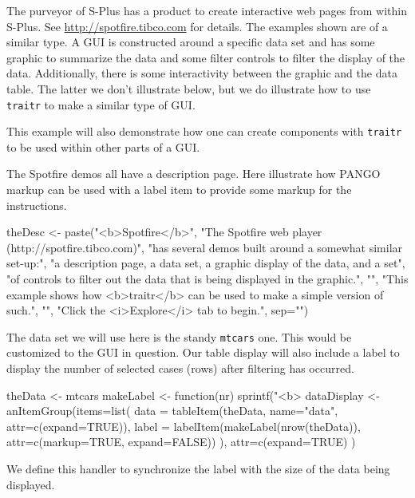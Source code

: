 \documentclass{article}
\newcommand{\code}[1]{\texttt{#1}} %
\newcommand{\pkg}[1]{\texttt{#1}}
\begin{document}
The purveyor of S-Plus has a product to create interactive web pages
from within S-Plus. See \url{http://spotfire.tibco.com} for
details. The examples shown are of a similar type. A GUI is
constructed around a specific data set and has some graphic to
summarize the data and some filter controls to filter the display of
the data. Additionally, there is some interactivity between the
graphic and the data table. The latter we don't illustrate below, but
we do illustrate how to use \pkg{traitr} to make a similar type of
GUI. 

This example will also demonstrate how one can create components with
\pkg{traitr} to be used within other parts of a GUI.

The Spotfire demos all have a description page. Here illustrate how
PANGO markup can be used with a label item to provide some markup for
the instructions.
\begin{Schunk}
\begin{Sinput}
 theDesc <- paste("<b>Spotfire</b>",
                  "The Spotfire web player (http://spotfire.tibco.com)",
                  "has several demos built around a somewhat similar set-up:",
                  "a description page, a data set, a graphic display of the data, and a set",
                  "of controls to filter out the data that is being displayed in the graphic.",
                  "",
                  "This example shows how <b>traitr</b> can be used to make a simple version of such.",
                  "",
                  "Click the <i>Explore</i> tab to begin.",
                  sep="\n")
\end{Sinput}
\end{Schunk}
The data set we will use here is the standy \code{mtcars} one. This
would be customized to the GUI in question. Our table display will
also include a label to display the number of selected cases (rows)
after filtering has occurred.
\begin{Schunk}
\begin{Sinput}
 theData <- mtcars
 makeLabel <- function(nr) sprintf("<b>%
 dataDisplay <- anItemGroup(items=list(
                              data = tableItem(theData, name="data", attr=c(expand=TRUE)),
                              label = labelItem(makeLabel(nrow(theData)), attr=c(markup=TRUE, expand=FALSE))
                              ),
                            attr=c(expand=TRUE)
                            )
\end{Sinput}
\end{Schunk}
We define this handler to synchronize the label with the size of the
data being displayed.
\begin{Schunk}
\end{Schunk}
\end{document}
